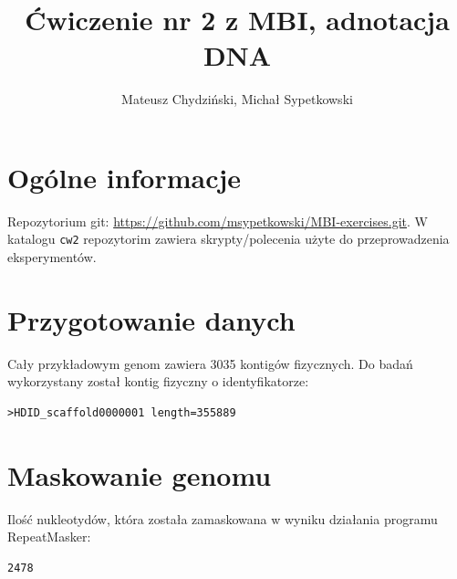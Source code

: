 \documentclass[a4paper]{article}
\begin{document}
\title{Ćwiczenie nr 2 z MBI, adnotacja DNA}
\author{Mateusz Chydziński, Michał Sypetkowski}
\maketitle

\section{Ogólne informacje}
Repozytorium git: \url{https://github.com/msypetkowski/MBI-exercises.git}.
W katalogu \texttt{cw2} repozytorim zawiera skrypty/polecenia użyte do przeprowadzenia eksperymentów.

\section{Przygotowanie danych}
Cały przykładowym genom zawiera 3035 kontigów fizycznych.
Do badań wykorzystany został kontig fizyczny o identyfikatorze:
\begin{verbatim}
>HDID_scaffold0000001 length=355889
\end{verbatim}

\section{Maskowanie genomu}
Ilość nukleotydów, która została zamaskowana w wyniku działania programu RepeatMasker:
\begin{verbatim}
2478
\end{verbatim}
\end{document}
